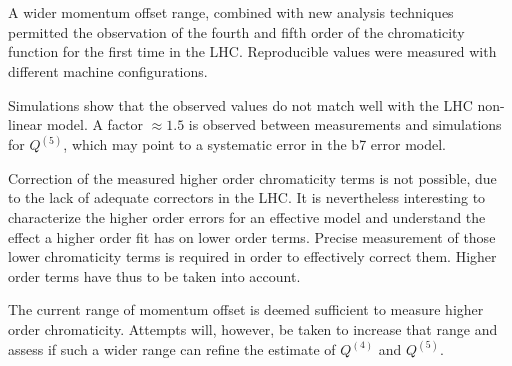 











\section{}

A wider momentum offset range, combined with new analysis techniques permitted the observation of
the fourth and fifth order of the chromaticity function for the first time in the LHC. Reproducible
values were measured with different machine configurations.

Simulations show that the observed values do not match well with the LHC non-linear model. A factor
$\approx 1.5$ is observed between measurements and simulations for $Q^{(5)}$, which may point to a
systematic error in the b7 error model.

Correction of the measured higher order chromaticity terms is not possible, due to the lack of
adequate correctors in the LHC. It is nevertheless interesting to characterize the higher order
errors for an effective model and understand the effect a higher order fit has on lower order terms.
Precise measurement of those lower chromaticity terms is required in order to effectively correct
them. Higher order terms have thus to be taken into account.

The current range of momentum offset is deemed sufficient to measure higher order chromaticity.
Attempts will, however, be taken to increase that range and assess if such a wider range can refine
the estimate of $Q^{(4)}$ and $Q^{(5)}$.